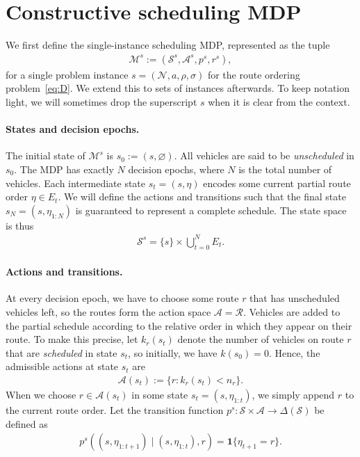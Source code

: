 \documentclass[a4paper]{report}
\theoremstyle{definition}
\theoremstyle{plain}
\begin{document}
\section{Constructive scheduling MDP}\label{sec:MDP}

We first define the single-instance scheduling MDP, represented as the tuple
\begin{align}
  \mathcal{M}^s := (\mathcal{S}^s, \mathcal{A}^s, p^s, r^s) ,
\end{align}
for a single problem instance $s = (\mathcal{N}, a, \rho, \sigma)$ for the route
ordering problem~\eqref{eq:D}.
%
We extend this to sets of instances afterwards.
%
To keep notation light, we will sometimes drop the superscript $s$ when it is
clear from the context.

\paragraph{States and decision epochs.}
The initial state of $\mathcal{M}^s$ is $s_0 := (s, \varnothing)$. All vehicles
are said to be \emph{unscheduled} in $s_0$.
The MDP has exactly $N$ decision epochs, where $N$ is the total number of
vehicles.
%
Each intermediate state $s_t = (s, \eta)$ encodes some current partial route
order $\eta \in E_t$.
%
We will define the actions and transitions such that the final state
$s_N = (s, \eta_{1:N})$ is guaranteed to represent a complete schedule.
%
The state space is thus
\begin{align}
  \mathcal{S}^s = \{s\} \times \bigcup_{t=0}^N E_t .
\end{align}

\paragraph{Actions and transitions.}

At every decision epoch, we have to choose some route $r$ that has unscheduled
vehicles left, so the routes form the action space $\mathcal{A} = \mathcal{R}$.
%
Vehicles are added to the partial schedule according to the relative order in
which they appear on their route.
%
To make this precise, let $k_r(s_t)$ denote the number of vehicles on route $r$
that are \emph{scheduled} in state $s_t$, so initially, we have $k(s_0) = 0$.
%
Hence, the admissible actions at state $s_t$ are
\begin{align}
  \mathcal{A}(s_t) := \{ r: k_r(s_t) < n_r \} .
\end{align}
%
When we choose $r \in \mathcal{A}(s_t)$ in some state $s_t = (s, \eta_{1:t})$,
we simply append $r$ to the current route order.
Let the transition function
$p^s : \mathcal{S} \times \mathcal{A} \rightarrow \Delta(\mathcal{S})$ be defined as
\begin{align}
  p^s((s, \eta_{1:t+1}) \mid (s, \eta_{1:t}), r) = \mathbf{1}\{ \eta_{t+1} = r \} .
\end{align}
\end{document}
